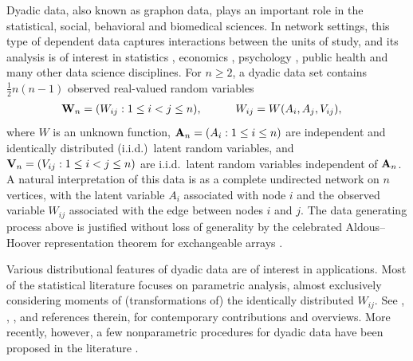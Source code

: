 Dyadic data, also known as graphon data,
plays an important role in the statistical, social,
behavioral and biomedical sciences.
In network settings,
this type of dependent data captures
interactions between the units of study,
and its analysis is
of interest in statistics \citep{kolaczyk2009statistical}, economics
\citep{graham2020network}, psychology \citep{kenny2020dyadic}, public health
\citep{luke2007network} and many other data science disciplines.
For $n \geq 2$, a dyadic data set contains
$\frac{1}{2}n(n-1)$
observed real-valued random variables
%
\begin{align*}
  \mathbf{W}_n = (W_{i j}:1\leq i<j \leq n),
  \quad\qquad W_{i j}
  &= W(A_i,A_j,V_{i j}),
\end{align*}
%
where $W$ is an unknown function, $\mathbf{A}_n=(A_{i}:1\leq i \leq n)$
are independent and identically distributed (i.i.d.)\ latent random variables,
and $\mathbf{V}_n=(V_{i j}:1\leq i<j \leq n)$ are i.i.d.\
latent random variables independent of $\mathbf{A}_n$.
A natural interpretation of
this data is as a complete
undirected network on $n$ vertices,
with the latent variable $A_i$ associated with node $i$
and the observed variable $W_{i j}$ associated
with the edge between nodes $i$ and $j$.
The data generating process above is justified
without loss of generality by the celebrated
Aldous--Hoover representation theorem
for exchangeable arrays
\citep{aldous1981representations, hoover1979relations}.

Various distributional features of dyadic data are of interest in applications.
Most of the statistical literature focuses on parametric analysis, almost
exclusively considering moments of (transformations of)
the identically distributed $W_{i j}$.
See \citet{davezies2021exchangeable}, \citet{gao2021minimax},
\citet{MatsushitaOtsu2021}, and references therein, for contemporary
contributions and overviews. More recently, however, a few nonparametric
procedures for dyadic data have been proposed in the literature
\citep{graham2021dyadicregression,graham2022kernel}.

